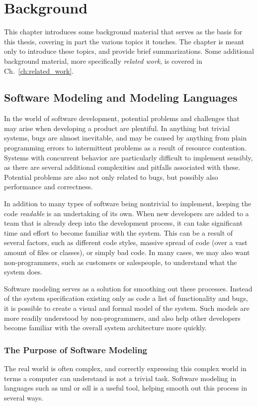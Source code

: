 \chapter{Background}
\label{ch:background}
This chapter introduces some background material that serves as the basis for this thesis, covering in part the various topics it touches. The chapter is meant only to introduce these topics, and provide brief summarizations. Some additional background material, more specifically \emph{related work}, is covered in Ch.~\ref{ch:related_work}. 

\section{Software Modeling and Modeling Languages}
\label{sec:software_modeling}
In the world of software development, potential problems and challenges that may arise when developing a product are plentiful. In anything but trivial systems, bugs are almost inevitable, and may be caused by anything from plain programming errors to intermittent problems as a result of resource contention. Systems with concurrent behavior are particularly difficult to implement sensibly, as there are several additional complexities and pitfalls associated with these. Potential problems are also not only related to bugs, but possibly also performance and correctness.

\noindent
In addition to many types of software being nontrivial to implement, keeping the code \emph{readable} is an undertaking of its own. When new developers are added to a team that is already deep into the development process, it can take significant time and effort to become familiar with the system. This can be a result of several factors, such as different code styles, massive spread of code (over a vast amount of files or classes), or simply bad code. In many cases, we may also want non-programmers, such as customers or salespeople, to understand what the system does.

\noindent
Software modeling serves as a solution for smoothing out these processes. Instead of the system specification existing only as code a list of functionality and bugs, it is possible to create a visual and formal model of the system. Such models are more readily understood by non-programmers, and also help other developers become familiar with the overall system architecture more quickly.

\subsection{The Purpose of Software Modeling}
\label{sec:software_modeling_purpose}
The real world is often complex, and correctly expressing this complex world in terms a computer can understand is not a trivial task. Software modeling in languages such as \gls{uml} or \gls{sdl} is a useful tool, helping smooth out this process in several ways.

